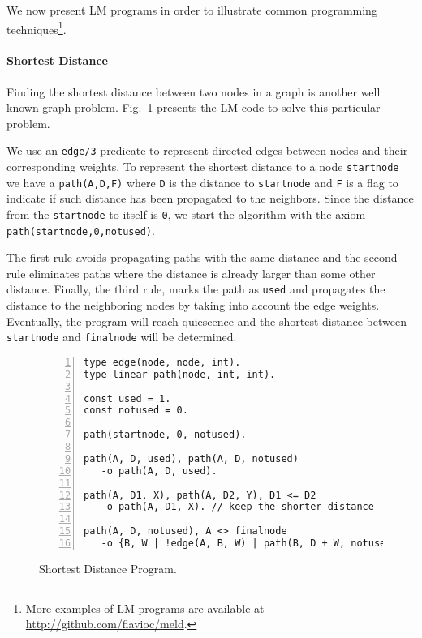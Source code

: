 
We now present LM programs in order to illustrate common programming techniques\footnote{More examples of LM programs are available at \url{http://github.com/flavioc/meld}.}.

\paragraph{Shortest Distance}

Finding the shortest distance between two nodes in a graph is another well known graph problem.
Fig.~\ref{code:shortest_path} presents the LM code to solve this particular problem.

We use an \texttt{edge/3}
predicate to represent directed edges between nodes and their corresponding weights. To represent the shortest
distance to a node \texttt{startnode} we have a \texttt{path(A,D,F)} where \texttt{D} is the distance to \texttt{startnode}
and \texttt{F} is a flag to indicate if such distance has been propagated to the neighbors. Since the distance from
the \texttt{startnode} to itself is \texttt{0}, we start the algorithm with the axiom \texttt{path(startnode,0,notused)}.

The first rule avoids propagating paths with the same distance and the second rule eliminates paths where the distance
is already larger than some other distance. Finally, the third rule, marks the path as \texttt{used} and propagates
the distance to the neighboring nodes by taking into account the edge weights.
Eventually, the program will reach quiescence and the shortest distance between \texttt{startnode} and \texttt{finalnode}
will be determined.

\newcommand{\BigO}[1]{\ensuremath{\operatorname{O}\bigl(#1\bigr)}}

\begin{figure}[h]
\scriptsize\begin{Verbatim}[numbers=left]
type edge(node, node, int).
type linear path(node, int, int).

const used = 1.
const notused = 0.

path(startnode, 0, notused).

path(A, D, used), path(A, D, notused)
   -o path(A, D, used).

path(A, D1, X), path(A, D2, Y), D1 <= D2
   -o path(A, D1, X). // keep the shorter distance

path(A, D, notused), A <> finalnode
   -o {B, W | !edge(A, B, W) | path(B, D + W, notused)}, path(A, D, used). // propagate new distance
\end{Verbatim}
\caption{Shortest Distance Program.}
\label{code:shortest_path}
\end{figure}
\normalsize

